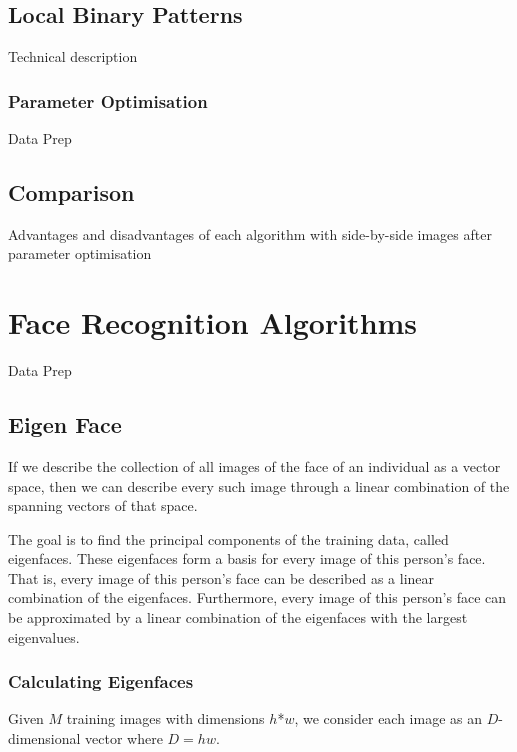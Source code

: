 \documentclass{article}
\begin{document}

\subsection{Local Binary Patterns}
Technical description
\subsubsection{Parameter Optimisation}
Data Prep

\subsection{Comparison}
Advantages and disadvantages of each algorithm with side-by-side images after parameter optimisation


\section{Face Recognition Algorithms}
Data Prep

\subsection{Eigen Face}
If we describe the collection of all images of the face of an individual as a vector space, then we can describe every such image through a linear combination of the spanning vectors of that space.

The goal is to find the principal components of the training data, called eigenfaces. These eigenfaces form a basis for every image of this person’s face. That is, every image of this person’s face can be described as a linear combination of the eigenfaces. Furthermore, every image of this person’s face can be approximated by a linear combination of the eigenfaces with the largest eigenvalues.

\subsubsection{Calculating Eigenfaces}
Given $M$ training images with dimensions $h$*$w$, we consider each image as an $D$-dimensional vector where $D = hw$.
\end{document}
